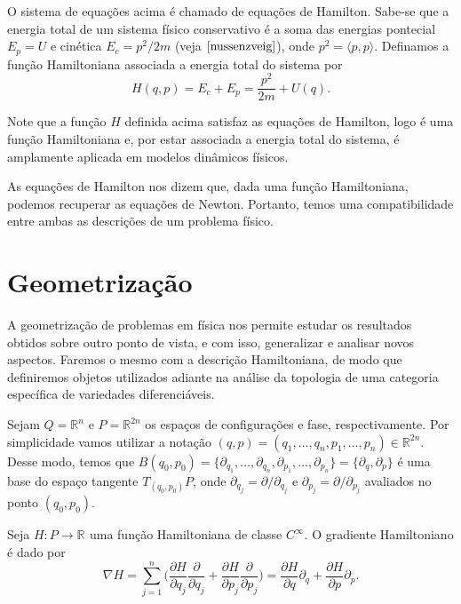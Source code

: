 \documentclass[12pt]{book}
\newcommand{\bigparenteses}[1]{\Big( #1 \Big) }
\newcommand{\derivadaparcial}[2]{\frac{\partial #1}{\partial #2}}
\newcommand{\derivadaparcialabrev}[1]{\partial_{#1}}
\newcommand{\produtointerno}[2]{\langle #1, #2 \rangle}
\newcommand{\real}[1]{\mathbb{R}^{#1}}
\newcommand{\reta}{\real{}}
\begin{document}
	O sistema de equações acima é chamado de equações de Hamilton. Sabe-se que a energia total de um sistema físico conservativo é a soma das energias pontecial $E_{p} = U$ e cinética $E_{c} = p^{2}/2m$ (veja $\cite{nussenzveig}$), onde $p^{2} = \produtointerno{p}{p}$. Definamos a função Hamiltoniana associada a energia total do sistema por
	$$
	H(q,p) = E_{c} +E_{p} = \frac{p^{2}}{2m}+U(q). 
	$$
	
	Note que a função $H$ definida acima satisfaz as equações de Hamilton, logo é uma função Hamiltoniana e, por estar associada a energia total do sistema, é amplamente aplicada em modelos dinâmicos físicos.
	
	As equações de Hamilton nos dizem que, dada uma função Hamiltoniana, podemos recuperar as equações de Newton. Portanto, temos uma compatibilidade entre ambas as descrições de um problema físico.
	
	\section{Geometrização}
	
	A geometrização de problemas em física nos permite estudar os resultados obtidos sobre outro ponto de vista, e com isso, generalizar e analisar novos aspectos. Faremos o mesmo com a descrição Hamiltoniana, de modo que definiremos objetos utilizados adiante na análise da topologia de uma categoria específica de variedades diferenciáveis.
	
	Sejam $Q= \real{n}$ e $P=\real{2n}$ os espaços de configurações e fase, respectivamente. Por simplicidade vamos utilizar a notação $(q, p ) = (q_{1}, \dots ,q_{n}, p_{1}, \dots ,p_{n}) \in \real{2n}$. Desse modo,  temos que $B(q_{0}, p_{0})=\{\partial_{q_{1}}, \dots, \partial_{q_{n}}, \partial_{p_{1}}, \dots, \partial_{p_{n}}\}= \{\partial_{q}, \partial_{p}\} $ é uma base do espaço tangente $T_{(q_{0},p_{0})} P $, onde $\partial_{q_{j}} = \partial/\partial_{q_{j}}$ e $\partial_{p_{j}} = \partial/\partial_{p_{j}}$ avaliados no ponto $(q_{0}, p_{0})$. 
	
	Seja $H:P \to \reta$ uma função Hamiltoniana de classe $C^{\infty}$. O gradiente Hamiltoniano é dado por
	$$
	\nabla H =\sum_{j=1}^{n} \bigparenteses{\derivadaparcial{H}{q_{j}}\derivadaparcial{}{q_{j}} + \derivadaparcial{H}{p_{j}}\derivadaparcial{}{p_{j}} }= \derivadaparcial{H}{q}\derivadaparcialabrev{q} + \derivadaparcial{H}{p}\derivadaparcialabrev{p}.
	$$
	
\end{document}
